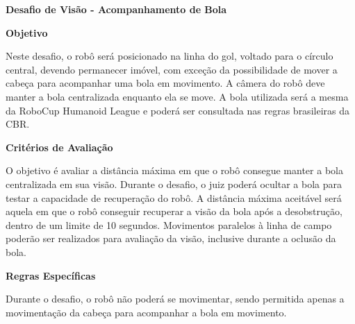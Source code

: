 \clearpage
\sffamily
{\bfseries\color[rgb]{0.4,0.4,0.4}Desafio de Visão - Acompanhamento de Bola}
{}

\bigskip

{\bfseries Objetivo}

\headlinebox

Neste desafio, o robô será posicionado na linha do gol, voltado para o círculo central, devendo permanecer imóvel, com exceção da possibilidade de mover a cabeça para acompanhar uma bola em movimento. A câmera do robô deve manter a bola centralizada enquanto ela se move. A bola utilizada será a mesma da RoboCup Humanoid League e poderá ser consultada nas regras brasileiras da CBR.

\bigskip

{\bfseries Critérios de Avaliação}

\headlinebox

O objetivo é avaliar a distância máxima em que o robô consegue manter a bola centralizada em sua visão. Durante o desafio, o juiz poderá ocultar a bola para testar a capacidade de recuperação do robô. A distância máxima aceitável será aquela em que o robô conseguir recuperar a visão da bola após a desobstrução, dentro de um limite de 10 segundos. Movimentos paralelos à linha de campo poderão ser realizados para avaliação da visão, inclusive durante a oclusão da bola.

\bigskip

{\bfseries Regras Específicas}

\headlinebox

Durante o desafio, o robô não poderá se movimentar, sendo permitida apenas a movimentação da cabeça para acompanhar a bola em movimento.